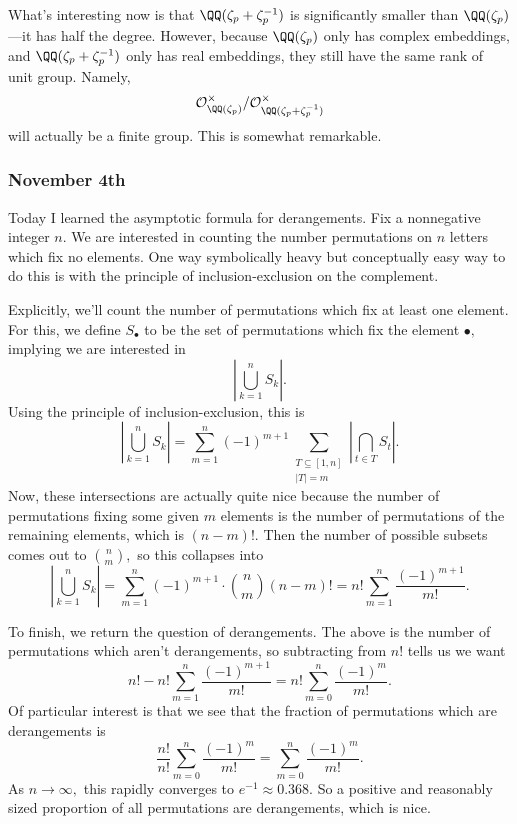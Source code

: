 What's interesting now is that $\QQ(\zeta_p+\zeta_p^{-1})$ is significantly smaller than $\QQ(\zeta_p)$---it has half the degree. However, because $\QQ(\zeta_p)$ only has complex embeddings, and $\QQ(\zeta_p+\zeta_p^{-1})$ only has real embeddings, they still have the same rank of unit group. Namely,
\[\mathcal O_{\QQ(\zeta_p)}^\times/\mathcal O_{\QQ(\zeta_p+\zeta_p^{-1})}^\times\]
will actually be a finite group. This is somewhat remarkable.

\subsubsection{November 4th}
Today I learned the asymptotic formula for derangements. Fix a nonnegative integer $n.$ We are interested in counting the number permutations on $n$ letters which fix no elements. One way symbolically heavy but conceptually easy way to do this is with the principle of inclusion-exclusion on the complement.

Explicitly, we'll count the number of permutations which fix at least one element. For this, we define $S_\bullet$ to be the set of permutations which fix the element $\bullet,$ implying we are interested in
\[\left|\bigcup_{k=1}^nS_k\right|.\]
Using the principle of inclusion-exclusion, this is
\[\left|\bigcup_{k=1}^nS_k\right|=\sum_{m=1}^n(-1)^{m+1}\sum_{\substack{T\subseteq[1,n]\\|T|=m}}\left|\bigcap_{t\in T}S_t\right|.\]
Now, these intersections are actually quite nice because the number of permutations fixing some given $m$ elements is the number of permutations of the remaining elements, which is $(n-m)!.$ Then the number of possible subsets comes out to $\binom nm,$ so this collapses into
\[\left|\bigcup_{k=1}^nS_k\right|=\sum_{m=1}^n(-1)^{m+1}\cdot\binom nm(n-m)!=n!\sum_{m=1}^n\frac{(-1)^{m+1}}{m!}.\]

To finish, we return the question of derangements. The above is the number of permutations which aren't derangements, so subtracting from $n!$ tells us we want
\[n!-n!\sum_{m=1}^n\frac{(-1)^{m+1}}{m!}=\boxed{n!\sum_{m=0}^n\frac{(-1)^m}{m!}}.\]
Of particular interest is that we see that the fraction of permutations which are derangements is
\[\frac{n!}{n!}\sum_{m=0}^n\frac{(-1)^m}{m!}=\sum_{m=0}^n\frac{(-1)^m}{m!}.\]
As $n\to\infty,$ this rapidly converges to $e^{-1}\approx0.368.$ So a positive and reasonably sized proportion of all permutations are derangements, which is nice.

